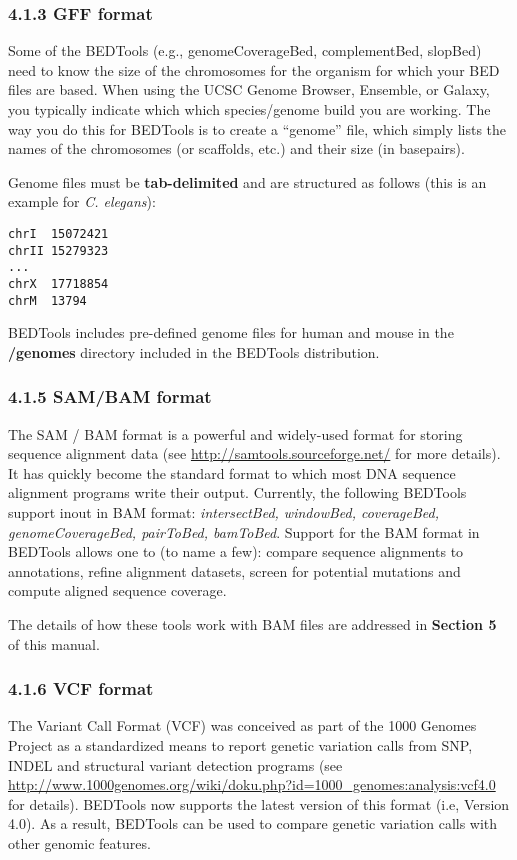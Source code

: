 \documentclass[letterpaper,10pt,english]{sphinxmanual}
\begin{document}
\subsubsection{4.1.3 GFF format}
\label{content/general-usage:id1}
Some of the BEDTools (e.g., genomeCoverageBed, complementBed, slopBed) need to know the size of
the chromosomes for the organism for which your BED files are based. When using the UCSC Genome
Browser, Ensemble, or Galaxy, you typically indicate which which species/genome build you are
working. The way you do this for BEDTools is to create a ``genome'' file, which simply lists the names of
the chromosomes (or scaffolds, etc.) and their size (in basepairs).

Genome files must be \textbf{tab-delimited} and are structured as follows (this is an example for \emph{C. elegans}):

\begin{Verbatim}[commandchars=\\\{\}]
chrI  15072421
chrII 15279323
...
chrX  17718854
chrM  13794
\end{Verbatim}

BEDTools includes pre-defined genome files for human and mouse in the \textbf{/genomes} directory included
in the BEDTools distribution.


\subsubsection{4.1.5 SAM/BAM format}
\label{content/general-usage:sam-bam-format}
The SAM / BAM format is a powerful and widely-used format for storing sequence alignment data (see
\href{http://samtools.sourceforge.net/}{http://samtools.sourceforge.net/} for more details). It has quickly become the standard format to which
most DNA sequence alignment programs write their output. Currently, the following BEDTools
support inout in BAM format: \emph{intersectBed, windowBed, coverageBed, genomeCoverageBed,
pairToBed, bamToBed}. Support for the BAM format in BEDTools allows one to (to name a few):
compare sequence alignments to annotations, refine alignment datasets, screen for potential mutations
and compute aligned sequence coverage.

The details of how these tools work with BAM files are addressed in \textbf{Section 5} of this manual.


\subsubsection{4.1.6 VCF format}
\label{content/general-usage:vcf-format}
The Variant Call Format (VCF) was conceived as part of the 1000 Genomes Project as a standardized
means to report genetic variation calls from SNP, INDEL and structural variant detection programs
(see \href{http://www.1000genomes.org/wiki/doku.php?id=1000\_genomes:analysis:vcf4.0}{http://www.1000genomes.org/wiki/doku.php?id=1000\_genomes:analysis:vcf4.0} for details).
BEDTools now supports the latest version of this format (i.e, Version 4.0). As a result, BEDTools can
be used to compare genetic variation calls with other genomic features.
\end{document}
